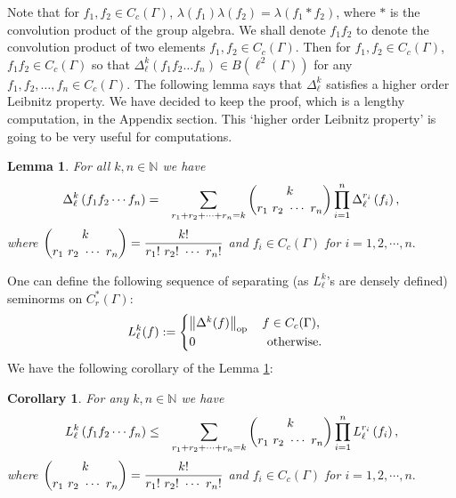 \documentclass[a4paper,11pt,reqno]{amsart}
\theoremstyle{plain}
\newtheorem{cor}[thm]{Corollary}
\newtheorem{lem}[thm]{Lemma}
\theoremstyle{mainthmstyle}
\theoremstyle{named}
\numberwithin{equation}{section}
\newcommand{\Bea}{\begin{eqnarray*}}
\newcommand{\Eea}{\end{eqnarray*}}
\begin{document}
 Note that for $f_{1},f_{2}\in C_{c}(\Gamma)$, $\lambda(f_{1})\lambda(f_{2})=\lambda(f_{1}\ast f_{2})$, where $\ast$ is the convolution product of the group algebra. We shall denote $f_{1}f_{2}$ to denote the convolution product of two elements $f_{1},f_{2}\in C_{c}(\Gamma)$. Then for $f_{1},f_{2}\in C_{c}(\Gamma)$, $f_{1}f_{2}\in C_{c}(\Gamma)$ so that $\Delta^{k}_{\ell}(f_{1}f_{2}\ldots f_{n})\in B(\ell^{2}(\Gamma))$ for any $f_{1},f_{2},\ldots,f_{n}\in C_{c}(\Gamma)$.
 The following lemma says that $\Delta_{\ell}^{k}$ satisfies a higher order Leibnitz property. We have decided to keep the proof, which is a lengthy computation, in the Appendix section. This `higher order Leibnitz property' is going to be very useful for computations.
\begin{lem} \label{higherleibnitz}
For all $k, n \in \mathbb N$ we have \Bea \Delta_{\ell}^{k} \left (f_{1}f_{2} \cdots f_{n} \right ) & = & \sum\limits_{r_{1} + r_{2} + \cdots + r_{n} = k} \dbinom {k} {r_{1}\ r_{2}\ \cdots\ r_{n}} \prod\limits_{i = 1}^{n} \Delta_{\ell}^{r_{i}} \left (f_{i} \right ), \Eea where $\dbinom {k} {r_{1}\ r_{2}\ \cdots\ r_{n}} = \dfrac {k!} {r_{1}!\ r_{2}!\ \cdots\ r_{n}!}$ and $f_{i} \in C_{c}(\Gamma)$ for $i = 1, 2, \cdots, n.$ 
\end{lem}
One can define the following sequence of separating (as $L_{\ell}^{k}$'s are densely defined) seminorms on $C^{\ast}_{r}(\Gamma)$:
$$L_{\ell}^k (f) : = \begin{cases} \left \|\Delta^{k} (f) \right \|_{\mathrm {op}} \quad f \in C_c (\Gamma), \\ 0 \quad \quad \hspace{13.2mm} \mathrm {otherwise}.\end{cases}$$
 We have the following corollary of the Lemma \ref{higherleibnitz}:
\begin{cor} \label{LeibnitzL}
For any $k, n \in \mathbb N$ we have \Bea L_{\ell}^{k} \left (f_{1}f_{2}\cdots f_{n} \right ) & \leq & \sum\limits_{r_{1} + r_{2} + \cdots + r_{n} = k} \dbinom {k} {r_{1}\ r_{2}\ \cdots\ r_{n}} \prod\limits_{i = 1}^{n} L_{\ell}^{r_{i}} \left (f_{i} \right ), \Eea where $\dbinom {k} {r_{1}\ r_{2}\ \cdots\ r_{n}} = \dfrac {k!} {r_{1}!\ r_{2}!\ \cdots\ r_{n}!}$ and $f_{i} \in C_{c} (\Gamma)$ for $i = 1, 2, \cdots, n.$
\end{cor}
\end{document}

